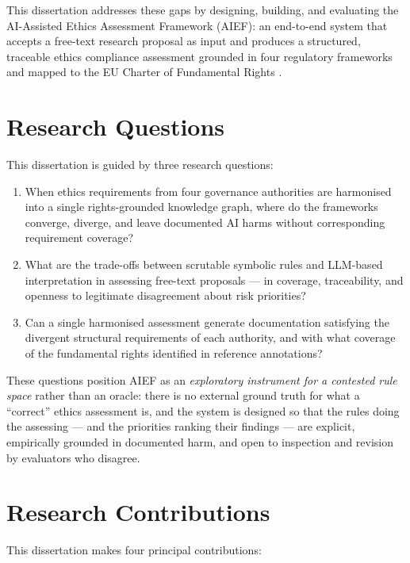 This dissertation addresses these gaps by designing, building, and evaluating the AI-Assisted Ethics Assessment Framework (AIEF): an end-to-end system that accepts a free-text research proposal as input and produces a structured, traceable ethics compliance assessment grounded in four regulatory frameworks and mapped to the EU Charter of Fundamental Rights \cite{eucharter2012}.


\section{Research Questions}

This dissertation is guided by three research questions:

\begin{enumerate}
\item[\textbf{RQ1:}] When ethics requirements from four governance authorities are harmonised into a single rights-grounded knowledge graph, where do the frameworks converge, diverge, and leave documented AI harms without corresponding requirement coverage?

\item[\textbf{RQ2:}] What are the trade-offs between scrutable symbolic rules and LLM-based interpretation in assessing free-text proposals --- in coverage, traceability, and openness to legitimate disagreement about risk priorities?

\item[\textbf{RQ3:}] Can a single harmonised assessment generate documentation satisfying the divergent structural requirements of each authority, and with what coverage of the fundamental rights identified in reference annotations?
\end{enumerate}

These questions position AIEF as an \emph{exploratory instrument for a contested rule space} rather than an oracle: there is no external ground truth for what a ``correct'' ethics assessment is, and the system is designed so that the rules doing the assessing --- and the priorities ranking their findings --- are explicit, empirically grounded in documented harm, and open to inspection and revision by evaluators who disagree.


\section{Research Contributions}

This dissertation makes four principal contributions:

